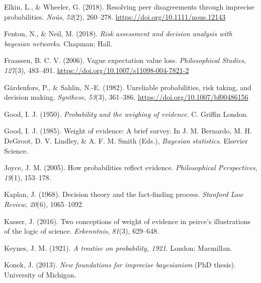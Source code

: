 \documentclass[
  10pt,
  dvipsnames,enabledeprecatedfontcommands]{scrartcl}
\newlength{\cslhangindent}
\newlength{\cslentryspacingunit} %
\newenvironment{CSLReferences}[2] %
 {%
  \setlength{\parindent}{0pt}
  \ifodd #1
  \let\oldpar\par
  \def\par{\hangindent=\cslhangindent\oldpar}
  \fi
  \setlength{\parskip}{#2\cslentryspacingunit}
 }%
 {}
\begin{document}
\begin{CSLReferences}{1}{0}
\leavevmode{}%
Elkin, L., \& Wheeler, G. (2018). Resolving peer disagreements through
imprecise probabilities. \emph{Noûs}, \emph{52}(2), 260--278.
\url{https://doi.org/10.1111/nous.12143}

\leavevmode{}%
Fenton, N., \& Neil, M. (2018). \emph{Risk assessment and decision
analysis with bayesian networks}. Chapman; Hall.

\leavevmode{}%
Fraassen, B. C. V. (2006). Vague expectation value loss.
\emph{Philosophical Studies}, \emph{127}(3), 483--491.
\url{https://doi.org/10.1007/s11098-004-7821-2}

\leavevmode{}%
Gärdenfors, P., \& Sahlin, N.-E. (1982). Unreliable probabilities, risk
taking, and decision making. \emph{Synthese}, \emph{53}(3), 361--386.
\url{https://doi.org/10.1007/bf00486156}

\leavevmode{}%
Good, I. J. (1950). \emph{Probability and the weighing of evidence}. C.
Griffin London.

\leavevmode{}%
Good, I. J. (1985). Weight of evidence: A brief survey. In J. M.
Bernardo, M. H. DeGroot, D. V. Lindley, \& A. F. M. Smith (Eds.),
\emph{Bayesian statistics}. Elsevier Science.

\leavevmode{}%
Joyce, J. M. (2005). How probabilities reflect evidence.
\emph{Philosophical Perspectives}, \emph{19}(1), 153--178.

\leavevmode{}%
Kaplan, J. (1968). Decision theory and the fact-finding process.
\emph{Stanford Law Review}, \emph{20}(6), 1065--1092.

\leavevmode{}%
Kasser, J. (2016). Two conceptions of weight of evidence in peirce's
illustrations of the logic of science. \emph{Erkenntnis}, \emph{81}(3),
629--648.

\leavevmode{}%
Keynes, J. M. (1921). \emph{A treatise on probability, 1921}. London:
Macmillan.

\leavevmode{}%
Konek, J. (2013). \emph{New foundations for imprecise bayesianism} (PhD
thesis). University of Michigan.


\end{CSLReferences}
\end{document}
